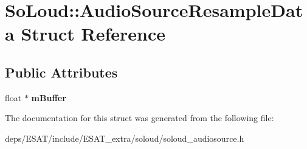 \hypertarget{struct_so_loud_1_1_audio_source_resample_data}{}\section{So\+Loud\+:\+:Audio\+Source\+Resample\+Data Struct Reference}
\label{struct_so_loud_1_1_audio_source_resample_data}
\subsection*{Public Attributes}
\begin{DoxyCompactItemize}
\item 
\mbox{\label{struct_so_loud_1_1_audio_source_resample_data_ae89072b6507e1f1c898fd9768a38a4d6}} 
float $\ast$ {\bfseries m\+Buffer}
\end{DoxyCompactItemize}


The documentation for this struct was generated from the following file\+:\begin{DoxyCompactItemize}
\item 
deps/\+E\+S\+A\+T/include/\+E\+S\+A\+T\+\_\+extra/soloud/soloud\+\_\+audiosource.\+h\end{DoxyCompactItemize}
